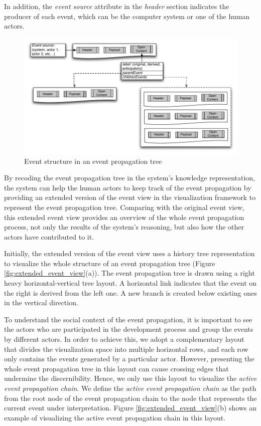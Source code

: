 In addition, the \emph{event source} attribute in the \emph{header} section indicates the producer of each event, which can be the computer system or one of the human actors.
\begin{figure}[htbp] %
	\centering
	\includegraphics{event_propagation_tree_representation.pdf} 
	\caption{Event structure in an event propagation tree}
	\label{fig:event_propagation_tree_representation}
\end{figure}

By recoding the event propagation tree in the system's knowledge representation, the system can help the human actors to keep track of the event propagation by providing an extended version of the event view in the visualization framework to represent the event propagation tree. Comparing with the original event view, this extended event view provides an overview of the whole event propagation process, not only the results of the system's reasoning, but also how the other actors have contributed to it.

Initially, the extended version of the event view uses a history tree representation \cite{Shrinivasan2008} to visualize the whole structure of an event propagation tree (Figure \ref{fig:extended_event_view}(a)). The event propagation tree is drawn using a right heavy horizontal-vertical tree layout. A horizontal link indicates that the event on the right is derived from the left one. A new branch is created below existing ones in the vertical direction. 

To understand the social context of the event propagation, it is important to see the actors who are participated in the development process and group the events by different actors. In order to achieve this, we adopt a complementary layout that divides the visualization space into multiple horizontal rows, and each row only contains the events generated by a particular actor. However, presenting the whole event propagation tree in this layout can cause crossing edges that undermine the discernibility. Hence, we only use this layout to visualize the \emph{active event propagation chain}. We define the \emph{active event propagation chain} as the path from the root node of the event propagation chain to the node that represents the current event under interpretation. Figure \ref{fig:extended_event_view}(b) shows an example of visualizing the active event propagation chain in this layout.

